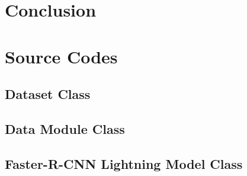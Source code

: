 \documentclass[12pt,oneside]{book} %
\begin{document}
\chapter{Conclusion}




\appendix
\chapter{Source Codes}
\begin{subappendices}
    \section{Dataset Class}\label{appendix:ChestXrayDataset}
    

    \newpage
    \section{Data Module Class}\label{appendix:ChestXrayDataModule}
    

    \newpage
    \section{Faster-R-CNN Lightning Model Class}\label{appendix:ChestXrayLightningModel}
    
\end{subappendices}

\end{document}
